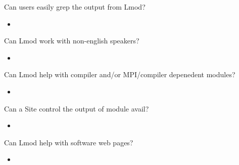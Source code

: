 \documentclass{beamer}
\begin{document}
\begin{frame}{Can users easily grep the output from Lmod?}
  \begin{itemize}
    \item 
  \end{itemize}
\end{frame}

\begin{frame}{Can Lmod work with non-english speakers?}
  \begin{itemize}
    \item 
  \end{itemize}
\end{frame}

\begin{frame}{Can Lmod help with compiler and/or MPI/compiler
      depenedent modules?}
  \begin{itemize}
    \item 
  \end{itemize}
\end{frame}

\begin{frame}{Can a Site control the output of module avail?}
  \begin{itemize}
    \item 
  \end{itemize}
\end{frame}

\begin{frame}{Can Lmod help with software web pages?}
  \begin{itemize}
    \item 
  \end{itemize}
\end{frame}






\end{document}
